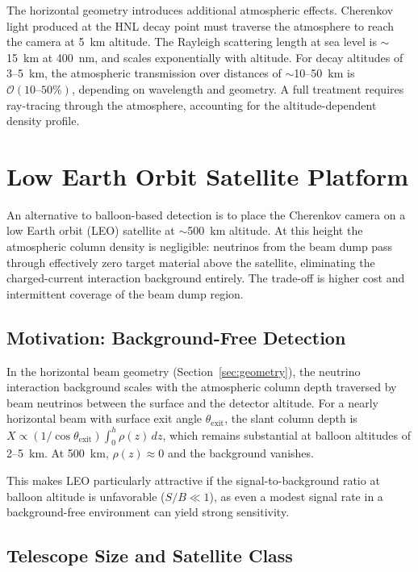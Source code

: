 \documentclass[11pt]{article}
\begin{document}
The horizontal geometry introduces additional atmospheric effects.
Cherenkov light produced at the HNL decay point must traverse the
atmosphere to reach the camera at 5~km altitude.  The Rayleigh
scattering length at sea level is $\sim$15~km at 400~nm, and scales
exponentially with altitude.  For decay altitudes of 3--5~km, the
atmospheric transmission over distances of $\sim$10--50~km is
$\mathcal{O}(10\text{--}50\%)$, depending on wavelength and geometry.
A full treatment requires ray-tracing through the atmosphere,
accounting for the altitude-dependent density profile.


\section{Low Earth Orbit Satellite Platform}
\label{sec:leo}

An alternative to balloon-based detection is to place the Cherenkov
camera on a low Earth orbit (LEO) satellite at $\sim$500~km altitude.
At this height the atmospheric column density is negligible: neutrinos
from the beam dump pass through effectively zero target material above
the satellite, eliminating the charged-current interaction background
entirely.  The trade-off is higher cost and intermittent coverage of
the beam dump region.

\subsection{Motivation: Background-Free Detection}

In the horizontal beam geometry (Section~\ref{sec:geometry}), the
neutrino interaction background scales with the atmospheric column
depth traversed by beam neutrinos between the surface and the detector
altitude.  For a nearly horizontal beam with surface exit angle
$\theta_{\text{exit}}$, the slant column depth is
$X \propto (1/\cos\theta_{\text{exit}}) \int_0^h \rho(z)\,dz$, which
remains substantial at balloon altitudes of 2--5~km.  At 500~km,
$\rho(z) \approx 0$ and the background vanishes.

This makes LEO particularly attractive if the signal-to-background
ratio at balloon altitude is unfavorable (${S/B \ll 1}$), as even a
modest signal rate in a background-free environment can yield strong
sensitivity.

\subsection{Telescope Size and Satellite Class}
\end{document}
